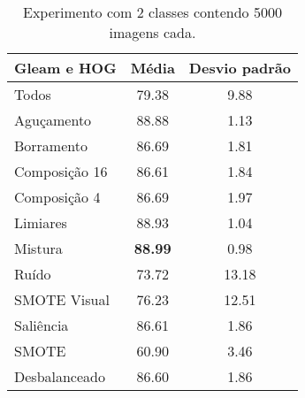 \begin{itemize}
\begin{table}[!htbp]
\centering
\caption{Experimento com 2 classes contendo 5000 imagens cada.}
\label{my-label}
\begin{tabular}{|l|c|c|}
\hline
\textbf{Gleam e HOG} & \textbf{Média} & \textbf{Desvio padrão} \\ \hline
Todos                & 79.38          & 9.88                   \\ \hline
Aguçamento           & 88.88          & 1.13                   \\ \hline
Borramento           & 86.69          & 1.81                   \\ \hline
Composição 16        & 86.61          & 1.84                   \\ \hline
Composição 4         & 86.69          & 1.97                   \\ \hline
Limiares             & 88.93          & 1.04                   \\ \hline
Mistura              & \textbf{88.99} & 0.98                   \\ \hline
Ruído                & 73.72          & 13.18                  \\ \hline
SMOTE Visual         & 76.23          & 12.51                  \\ \hline
Saliência            & 86.61          & 1.86                   \\ \hline
SMOTE                & 60.90          & 3.46                   \\ \hline
Desbalanceado        & 86.60          & 1.86                   \\ \hline
\end{tabular}
\end{table}

\end{itemize}

